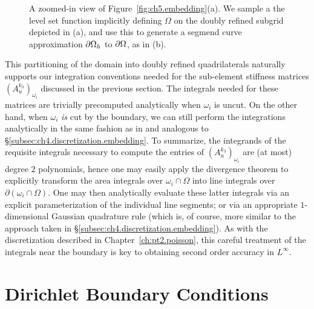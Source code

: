 \setlength{\figurewidth}{0.40\columnwidth}
\begin{figure}[htbp]
\begin{center}
\caption{A zoomed-in view of Figure~\ref{fig:ch5.embedding}(a). We sample a the level set function implicitly defining $\Omega$ on the doubly refined subgrid depicted in (a), and use this to generate a segmend curve approximation $\partial\Omega_h$ to $\partial\Omega$, as in (b).}
\label{fig:ch5.boundary}
\end{center}
\end{figure}

This partitioning of the domain into doubly refined quadrilaterals naturally supports our integration conventions needed for the sub-element stiffness matrices $(A_u^{k_3})_{\omega_i}$ discussed in the previous section. The integrals needed for these matrices are trivially precomputed analytically when $\omega_i$ is uncut. On the other hand, when $\omega_i$ \emph{is} cut by the boundary, we can still perform the integrations analytically in the same fashion as in \cite{Bedrossian10} and analogous to \S\ref{subsec:ch4.discretization.embedding}. To summarize, the integrands of the requisite integrals necessary to compute the entries of $(A_u^{k_3})_{\omega_i}$ are (at most) degree $2$ polynomials, hence one may easily apply the divergence theorem to explicitly transform the area integrals over $\omega_i \cap \Omega$ into line integrals over $\partial(\omega_i \cap \Omega)$. One may then analytically evaluate these latter integrals via an explicit parameterization of the individual line segments; or via an appropriate $1$-dimensional Gaussian quadrature rule (which is, of course, more similar to the approach taken in \S\ref{subsec:ch4.discretization.embedding}). As with the discretization described in Chapter~\ref{ch:pt2.poisson}, this careful treatment of the integrals near the boundary is key to obtaining second order accuracy in $L^\infty$.

\section{Dirichlet Boundary Conditions} \label{sec:ch5.dirichlet}

